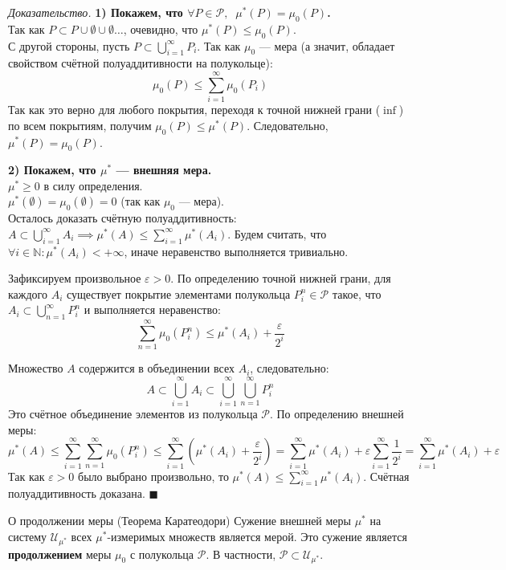 \documentclass[12pt,a4paper]{article}
\newenvironment{Proof}[1][Доказательство]{\vspace{0.5em}\noindent\textit{#1.}\hspace{0.5em}\ignorespaces}{\hfill$\blacksquare$\vspace{1em}}
\begin{document}
\begin{Proof}
\textbf{1) Покажем, что $\forall P \in \mathcal{P}, \;\; \mu^*(P) = \mu_0(P)$.} \\
Так как $P \subset P \cup \emptyset \cup \emptyset \dots$, очевидно, что $\mu^*(P) \le \mu_0(P)$. \\
С другой стороны, пусть $P \subset \bigcup\limits_{i=1}^{\infty} P_i$. Так как $\mu_0$ — мера (а значит, обладает свойством счётной полуаддитивности на полукольце):
$$ \mu_0(P) \le \sum\limits_{i=1}^{\infty} \mu_0(P_i) $$
Так как это верно для любого покрытия, переходя к точной нижней грани ($\inf$) по всем покрытиям, получим $\mu_0(P) \le \mu^*(P)$. Следовательно, $\mu^*(P) = \mu_0(P)$.

\textbf{2) Покажем, что $\mu^*$ — внешняя мера.} \\
$\mu^* \ge 0$ в силу определения. \\
$\mu^*(\emptyset) = \mu_0(\emptyset) = 0$ (так как $\mu_0$ — мера). \\
Осталось доказать счётную полуаддитивность: $A \subset \bigcup\limits_{i=1}^{\infty} A_i \implies \mu^*(A) \le \sum\limits_{i=1}^{\infty} \mu^*(A_i)$.
Будем считать, что $\forall i \in \mathbb{N}: \mu^*(A_i) < +\infty$, иначе неравенство выполняется тривиально.

Зафиксируем произвольное $\varepsilon > 0$. По определению точной нижней грани, для каждого $A_i$ существует покрытие элементами полукольца $P_i^n \in \mathcal{P}$ такое, что $A_i \subset \bigcup\limits_{n=1}^{\infty} P_i^n$ и выполняется неравенство:
$$ \sum\limits_{n=1}^{\infty} \mu_0(P_i^n) \le \mu^*(A_i) + \frac{\varepsilon}{2^i} $$

Множество $A$ содержится в объединении всех $A_i$, следовательно:
$$ A \subset \bigcup\limits_{i=1}^{\infty} A_i \subset \bigcup\limits_{i=1}^{\infty} \bigcup\limits_{n=1}^{\infty} P_i^n $$
Это счётное объединение элементов из полукольца $\mathcal{P}$. По определению внешней меры:
$$ \mu^*(A) \le \sum\limits_{i=1}^{\infty} \sum\limits_{n=1}^{\infty} \mu_0(P_i^n) \le \sum\limits_{i=1}^{\infty} \left( \mu^*(A_i) + \frac{\varepsilon}{2^i} \right) = \sum\limits_{i=1}^{\infty} \mu^*(A_i) + \varepsilon \sum\limits_{i=1}^{\infty} \frac{1}{2^i} = \sum\limits_{i=1}^{\infty} \mu^*(A_i) + \varepsilon $$
Так как $\varepsilon > 0$ было выбрано произвольно, то $\mu^*(A) \le \sum\limits_{i=1}^{\infty} \mu^*(A_i)$. Счётная полуаддитивность доказана.
\end{Proof}

\begin{Theorem}{О продолжении меры (Теорема Каратеодори)}{}
Сужение внешней меры $\mu^*$ на систему $\mathcal{U}_{\mu^*}$ всех $\mu^*$-измеримых множеств является мерой. Это сужение является \textbf{продолжением} меры $\mu_0$ с полукольца $\mathcal{P}$. В частности, $\mathcal{P} \subset \mathcal{U}_{\mu^*}$.
\end{Theorem}
\end{document}
